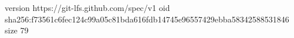 version https://git-lfs.github.com/spec/v1
oid sha256:f73561c6fec124c99a05c81bda616fdb14745e96557429ebba58342588531846
size 79
